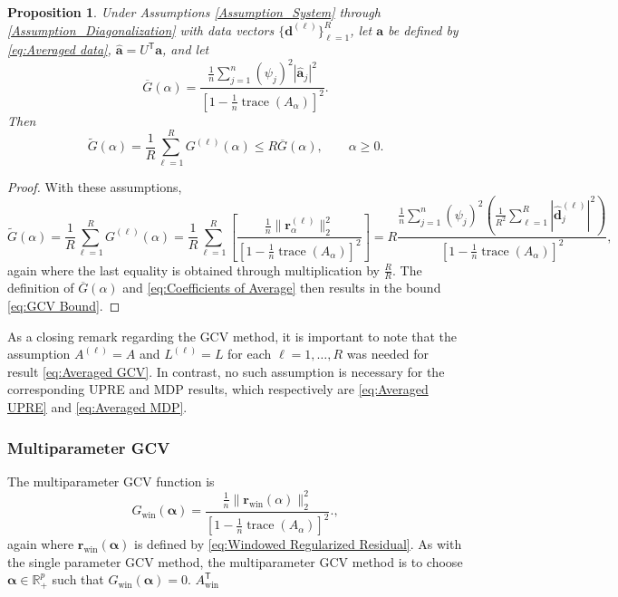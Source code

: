 \documentclass[12pt]{article}
\newcommand{\aVec}{\mathbf{a}}	%
\newcommand{\dVec}{\mathbf{d}}	%
\newcommand{\rVec}{\mathbf{r}}	%
\newcommand{\trans}[1]{{#1}^\mathsf{T}}	%
\DeclareMathOperator{\trace}{trace}		%
\newcommand{\dft}[1]{\widehat{#1}}	%
\newcommand{\regparam}{\alpha}  %
\newcommand{\regparamVec}{\bm{\regparam}}   %
\newcommand{\mfilt}{\psi}
\newcommand{\regres}{\mathbf{r}_{\regparam}}	%
\newcommand{\A}{A_{\regparam}}	%
\newcommand{\G}{G}	%
\newcommand{\Gwin}{\G_{\text{win}}}	%
\newtheorem{proposition}{Proposition}[section]
\begin{document}
\begin{proposition}
Under Assumptions \ref{Assumption_System} through \ref{Assumption_Diagonalization} with data vectors $\{\dVec^{(\ell)}\}_{\ell=1}^R$, let $\aVec$ be defined by \eqref{eq:Averaged data}, $\dft{\aVec} = \trans{U}\aVec$, and let
\begin{equation}
\label{eq:GCV of Average}
\overline{\G}(\regparam) = \frac{\frac{1}{n}\sum_{j=1}^{n} \left(\mfilt_j\right)^2|\dft{\aVec}_j|^2}{\left[1 - \frac{1}{n}\trace\left(\A\right)\right]^2}.
\end{equation}
Then
\begin{equation}
\label{eq:GCV Bound}
\widetilde{\G}(\regparam) = \frac{1}{R} \sum_{\ell=1}^R \G^{(\ell)}(\regparam) \leq R \overline{\G}(\regparam), \qquad \regparam \geq 0.
\end{equation}
\end{proposition}

\begin{proof}
With these assumptions,
\[\widetilde{\G}(\regparam) = \frac{1}{R} \sum_{\ell=1}^R \G^{(\ell)}(\regparam) = \frac{1}{R}\sum_{\ell=1}^R \left[\frac{\frac{1}{n}\|\regres^{(\ell)}\|_2^2}{\left[1 - \frac{1}{n}\trace\left(\A\right)\right]^2}\right]  = R\frac{\frac{1}{n}\sum_{j=1}^{n} \left(\mfilt_j\right)^2\left(\frac{1}{R^2} \sum_{\ell=1}^R |\dft{\dVec}_j^{(\ell)}|^2\right)}{\left[1 - \frac{1}{n}\trace\left(\A\right)\right]^2},\]
again where the last equality is obtained through multiplication by $\frac{R}{R}$. The definition of $\overline{\G}(\regparam)$ and \eqref{eq:Coefficients of Average} then results in the bound \eqref{eq:GCV Bound}.
\end{proof}

As a closing remark regarding the GCV method, it is important to note that the assumption $A^{(\ell)} = A$ and $L^{(\ell)} = L$ for each $\ell = 1,\ldots,R$ was needed for result \eqref{eq:Averaged GCV}. In contrast, no such assumption is necessary for the corresponding UPRE and MDP results, which respectively are \eqref{eq:Averaged UPRE} and \eqref{eq:Averaged MDP}.

\subsubsection{Multiparameter GCV} \label{sec:Multiparameter GCV}
The multiparameter GCV function is
\begin{equation}
\label{eq:Windowed GCV}
    \Gwin(\regparamVec) = \frac{\frac{1}{n}\|\rVec_{\text{win}}(\regparam)\|_2^2}{\left[1 - \frac{1}{n}\trace(\A)\right]^2}.,
\end{equation}
again where $\rVec_\text{win}(\regparamVec)$ is defined by \eqref{eq:Windowed Regularized Residual}. As with the single parameter GCV method, the multiparameter GCV method is to choose $\regparamVec \in \mathbb{R}_+^p$ such that $\Gwin(\regparamVec) = 0$. $\trans{A}_{\text{win}}$
\end{document}
